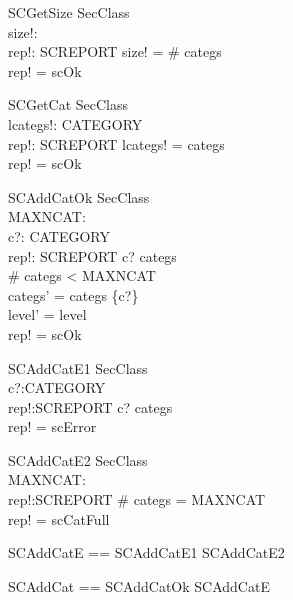\begin{schema}{SCGetSize}
\Xi SecClass \\
size!: \nat \\
rep!: SCREPORT
\where
size! = \# categs \\
rep! = scOk
\end{schema}

\begin{schema}{SCGetCat}
\Xi SecClass \\
lcategs!: \seq CATEGORY \\
rep!: SCREPORT
\where
\ran lcategs! = categs \\
rep! = scOk
\end{schema}


\begin{schema}{SCAddCatOk}
\Delta SecClass \\
MAXNCAT: \nat \\
c?: CATEGORY \\
rep!: SCREPORT
\where
c? \notin categs \\
\# categs < MAXNCAT \\
categs' = categs \cup \{c?\} \\
level' = level \\
rep! = scOk
\end{schema}

\begin{schema}{SCAddCatE1}
\Xi SecClass \\
c?:CATEGORY \\
rep!:SCREPORT
\where
c? \in categs \\
rep! = scError
\end{schema}

\begin{schema}{SCAddCatE2}
\Xi SecClass \\
MAXNCAT: \nat \\
rep!:SCREPORT
\where
\# categs = MAXNCAT \\
rep! = scCatFull
\end{schema}

\begin{zed}
SCAddCatE == SCAddCatE1 \lor SCAddCatE2 \also

SCAddCat == SCAddCatOk \lor SCAddCatE
\end{zed}

